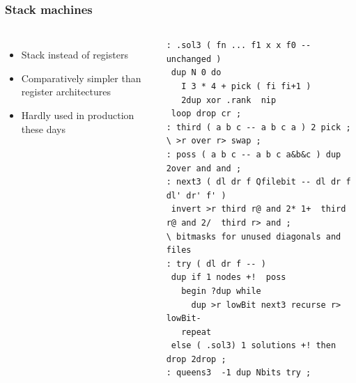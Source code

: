 \documentclass{beamer}
\begin{document}
\begin{frame}[fragile]
  \frametitle{Stack machines}
  \begin{columns}
    \begin{itemize}
      \item<1-> Stack instead of registers
      \item<2-> Comparatively simpler than register architectures
      \item<3-> Hardly used in production these days
    \end{itemize}

    \begin{lstlisting}[caption={8 Queens problem in Forth}]
: .sol3 ( fn ... f1 x x f0 -- unchanged )
 dup N 0 do
   I 3 * 4 + pick ( fi fi+1 )
   2dup xor .rank  nip
 loop drop cr ;
: third ( a b c -- a b c a ) 2 pick ;    \ >r over r> swap ;
: poss ( a b c -- a b c a&b&c ) dup 2over and and ;
: next3 ( dl dr f Qfilebit -- dl dr f dl' dr' f' )
 invert >r third r@ and 2* 1+  third r@ and 2/  third r> and ;
\ bitmasks for unused diagonals and files
: try ( dl dr f -- )
 dup if 1 nodes +!  poss
   begin ?dup while
     dup >r lowBit next3 recurse r> lowBit-
   repeat
 else ( .sol3) 1 solutions +! then drop 2drop ;
: queens3  -1 dup Nbits try ;
    \end{lstlisting}
  \end{columns}
\end{frame}
\end{document}

